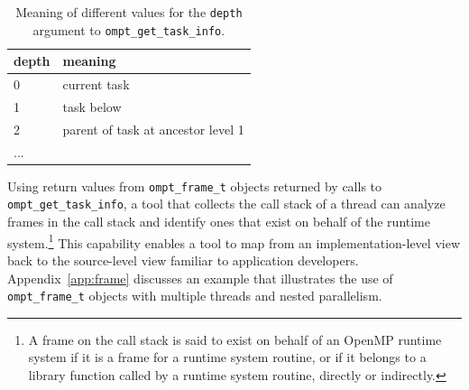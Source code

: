 \documentclass{article}
\begin{document}

\begin{table}
\centering
\begin{tabular}{|l|l|}
\hline
depth & meaning\\\hline
 0 & current task  \\\hline
1 & task below  \\\hline
2 &  parent of task at ancestor level 1 \\\hline
... & \\\hline
\end{tabular}
\caption{Meaning of different  values for the {\tt depth} argument to {\tt ompt\_get\_task\_info}.}
\label{tab:task-ancestor}
\end{table}

Using return values from  \verb|ompt_frame_t| objects returned by calls to  \verb|ompt_get_task_info|, a tool that collects the call stack of a thread can analyze  frames in the call stack and identify ones that exist on behalf of the runtime system.\footnote{A frame on the call stack is said to exist on behalf of an OpenMP runtime system if it is a frame for a runtime system routine, or if it belongs to a library function called by a runtime system routine, directly or indirectly.} 
This capability enables a tool to map from an implementation-level view back to the source-level view familiar to application developers. 
Appendix~\ref{app:frame} discusses  an example that illustrates the use of \verb|ompt_frame_t| objects with multiple threads and nested parallelism.
\end{document}
